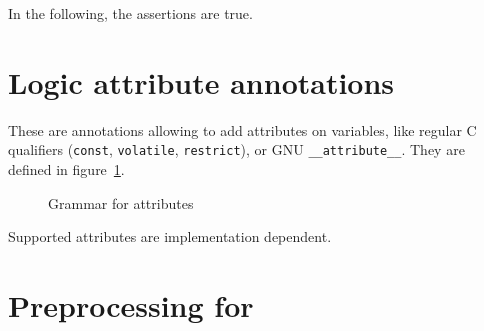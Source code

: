 \begin{example}
  In the following, the assertions are true.
\end{example}

\section{Logic attribute annotations}
\label{sec:attribute_annot}

\experimental

These are annotations allowing to add attributes on variables,
like regular C qualifiers (\texttt{const}, \texttt{volatile}, \texttt{restrict}),
or GNU \texttt{\_\_attribute\_\_}. They are defined in figure~\ref{fig:gram:attr}.

\begin{figure}[htb]
\begin{cadre}

\end{cadre}
\caption{Grammar for \NAME attributes}
\label{fig:gram:attr}
\end{figure}

Supported attributes are implementation dependent.

\section{Preprocessing for \NAME}
\label{sec:ppimpl}




